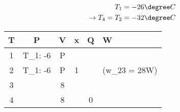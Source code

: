 

\item[b)] 
    \begin{align*}
    T_1 &= -26 \degree C \\
    \rightarrow T_4 = T_2 &= -32 \degree C
    \end{align*}
    
    \begin{tabular}{c|c|c|c|c}
    T & P & V & x & Q & W \\
     & T_1: -6 & P & & & \\
    2 & T_1: -6 & P & 1 & & (w_{23} = 28W) \\
    3 & & 8 & & & \\
    4 & & 8 & & 0 & \\
    \end{tabular}